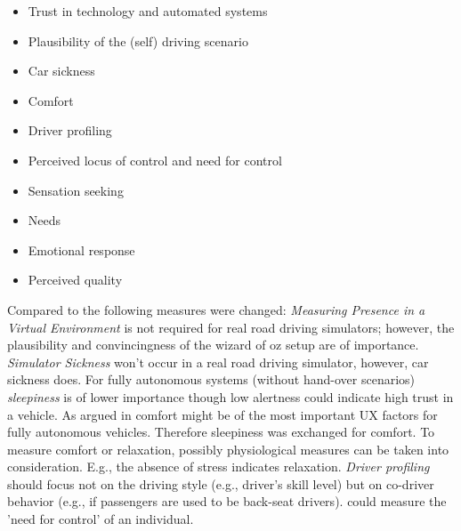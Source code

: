 \begin{itemize} %
  \item Trust in technology and automated systems
  \item Plausibility of the (self) driving scenario 
  \item Car sickness 
  \item Comfort
  \item Driver profiling
  \item Perceived locus of control and need for control
  \item Sensation seeking
  \item Needs
  \item Emotional response
  \item Perceived quality
\end{itemize}
Compared to \cite{Ive} the following measures were changed: \emph{Measuring Presence in a Virtual Environment} is not required for real road driving simulators; however, the plausibility and convincingness of the wizard of oz setup are of importance. \emph{Simulator Sickness} won't occur in a real road driving simulator, however, car sickness does. For fully autonomous systems (without hand-over scenarios) \emph{sleepiness} is of lower importance though low alertness could indicate high trust in a vehicle. As argued in  comfort might be of the most important UX factors for fully autonomous vehicles. Therefore sleepiness was exchanged for comfort. To measure comfort or relaxation, possibly physiological measures can be taken into consideration. E.g., the absence of stress \cite{Salai2016} indicates relaxation. \emph{Driver profiling} should focus not on the driving style (e.g., driver’s skill level) but on co-driver behavior (e.g., if passengers are used to be back-seat drivers). \cite{Burger1979TheControl} could measure the 'need for control' of an individual.

